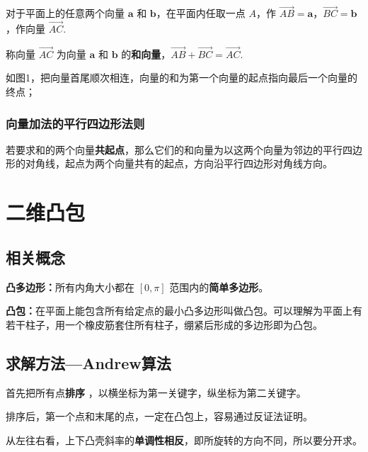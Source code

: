 \documentclass[a4paper, UTF8]{ctexart}
\begin{document}
对于平面上的任意两个向量 $\boldsymbol{a}$ 和
$\boldsymbol{b}$，在平面内任取一点 $A$，作
$\overrightarrow{AB}=\boldsymbol{a}$，$\overrightarrow{BC}=\boldsymbol{b}$，作向量
$\overrightarrow{AC}$.

称向量 $\overrightarrow{AC}$ 为向量 $\boldsymbol{a}$ 和
$\boldsymbol{b}$ 的\textbf{和向量}，$\overrightarrow{AB}+\overrightarrow{BC}=\overrightarrow{AC}.$

\begin{figure}[H]
\centering

\caption{}
\label{fig:1}
\end{figure}

如图1，把向量首尾顺次相连，向量的和为第一个向量的起点指向最后一个向量的终点；

\subsubsection{向量加法的平行四边形法则}

若要求和的两个向量\textbf{共起点}，那么它们的和向量为以这两个向量为邻边的平行四边形的对角线，起点为两个向量共有的起点，方向沿平行四边形对角线方向。


\section{二维凸包}

\subsection{相关概念}

\textbf{凸多边形：}所有内角大小都在 $[0,\pi]$ 范围内的\textbf{简单多边形}。

\textbf{凸包：}在平面上能包含所有给定点的最小凸多边形叫做凸包。可以理解为平面上有若干柱子，用一个橡皮筋套住所有柱子，绷紧后形成的多边形即为凸包。

\subsection{求解方法---Andrew算法}

首先把所有点\textbf{排序} ，以横坐标为第一关键字，纵坐标为第二关键字。

排序后，第一个点和末尾的点，一定在凸包上，容易通过反证法证明。

从左往右看，上下凸壳斜率的\textbf{单调性相反}，即所旋转的方向不同，所以要分开求。
\end{document}
